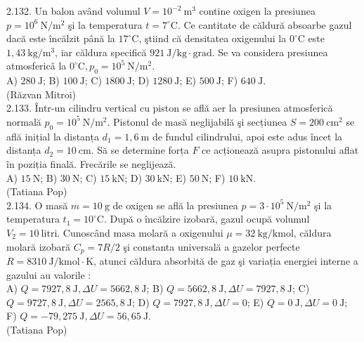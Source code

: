 2.132. Un balon având volumul $V=10^{-2} \mathrm{~m}^{3}$ contine oxigen la presiunea $p=10^{6} \mathrm{~N} / \mathrm{m}^{2}$ şi la temperatura $t=7^{\circ} \mathrm{C}$. Ce cantitate de căldură absoarbe gazul dacă este încălzit până la $17^{\circ} \mathrm{C}$, ştiind că densitatea oxigenului la $0^{\circ} \mathrm{C}$ este $1,43 \mathrm{~kg} / \mathrm{m}^{3}$, iar căldura specifică $921 \mathrm{~J} / \mathrm{kg} \cdot \mathrm{grad}$. Se va considera presiunea atmosfericǎ la $0^{\circ} \mathrm{C}, p_{0}=10^{5} \mathrm{~N} / \mathrm{m}^{2}$.\\ A) $280 \mathrm{~J}$; B) $100 \mathrm{~J}$; C) $1800 \mathrm{~J}$; D) $1280 \mathrm{~J}$; E) $500 \mathrm{~J}$; F) $640 \mathrm{~J}$.\\ (Răzvan Mitroi)\\

2.133. Într-un cilindru vertical cu piston se află aer la presiunea atmosferică normală $p_{0}=10^{5} \mathrm{~N} / \mathrm{m}^{2}$. Pistonul de masă neglijabilă şi secțiunea $S=200 \mathrm{~cm}^{2}$ se află inițial la distanța $d_{1}=1,6 \mathrm{~m}$ de fundul cilindrului, apoi este adus încet la distanța $d_{2}=10 \mathrm{~cm}$. Să se determine forța $F$ ce acționează asupra pistonului aflat în poziția finală. Frecările se neglijează.\\ A) $15 \mathrm{~N}$; B) $30 \mathrm{~N}$; C) $15 \mathrm{~kN}$; D) $30 \mathrm{~kN}$; E) $50 \mathrm{~N}$; F) $10 \mathrm{~kN}$.\\ (Tatiana Pop)\\

2.134. O masă $m=10 \mathrm{~g}$ de oxigen se află la presiunea $p=3 \cdot 10^{5} \mathrm{~N} / \mathrm{m}^{2}$ şi la temperatura $t_{1}=10^{\circ} \mathrm{C}$. După o încălzire izobară, gazul ocupă volumul $V_{2}=10 \mathrm{~litri}$. Cunoscând masa molară a oxigenului $\mu=32 \mathrm{~kg} / \mathrm{kmol}$, căldura molară izobară $C_{p}=7 R / 2$ şi constanta universală a gazelor perfecte $R=8310 \mathrm{~J} / \mathrm{kmol} \cdot \mathrm{K}$, atunci căldura absorbită de gaz şi variația energiei interne a gazului au valorile :\\ A) $Q=7927,8 \mathrm{~J}, \Delta U=5662,8 \mathrm{~J}$; B) $Q=5662,8 \mathrm{~J}, \Delta U=7927,8 \mathrm{~J}$; C) $Q=9727,8 \mathrm{~J}, \Delta U=2565,8 \mathrm{~J}$; D) $Q=7927,8 \mathrm{~J}, \Delta U=0$; E) $Q=0 \mathrm{~J}, \Delta U=0 \mathrm{~J}$; F) $Q=-79,275 \mathrm{~J}, \Delta U=56,65 \mathrm{~J}$.\\ (Tatiana Pop)\\


